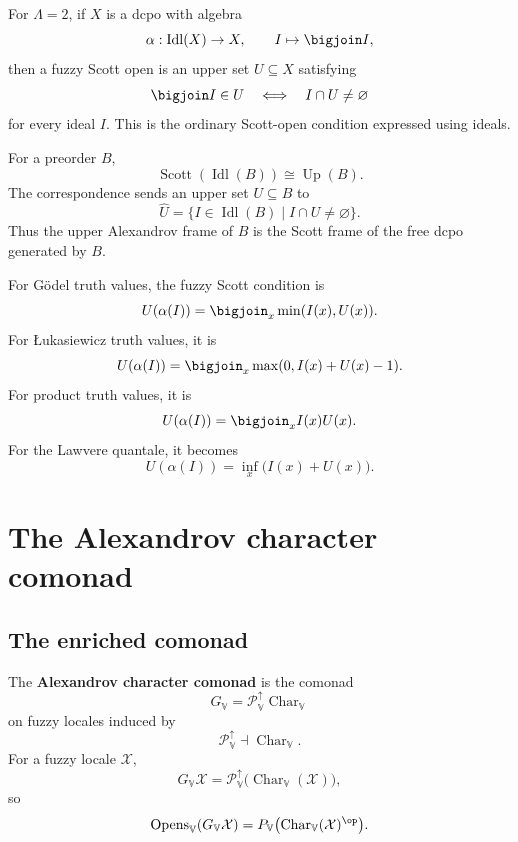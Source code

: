 \begin{example}
\label{ex:crisp-scott-opens}
For \(\Lambda=2\), if \(X\) is a dcpo with algebra
\[
    \alpha:\operatorname{Idl}(X)\to X,
    \qquad
    I\mapsto\bigjoin I,
\]
then a fuzzy Scott open is an upper set \(U\subseteq X\) satisfying
\[
    \bigjoin I\in U
    \quad\Longleftrightarrow\quad
    I\cap U\neq\varnothing
\]
for every ideal \(I\).  This is the ordinary Scott-open condition expressed using
ideals.
\end{example}

\begin{example}
\label{ex:upper-sets-as-scott-opens-ideal-completion}
For a preorder \(B\),
\[
    \operatorname{Scott}(\operatorname{Idl}(B))
    \cong
    \operatorname{Up}(B).
\]
The correspondence sends an upper set \(U\subseteq B\) to
\[
    \widehat U
    =
    \{I\in\operatorname{Idl}(B)\mid I\cap U\neq\varnothing\}.
\]
Thus the upper Alexandrov frame of \(B\) is the Scott frame of the free dcpo
generated by \(B\).
\end{example}

\begin{example}
\label{ex:standard-fuzzy-scott-opens}
For G\"odel truth values, the fuzzy Scott condition is
\[
    U(\alpha(I))
    =
    \bigjoin_x \min(I(x),U(x)).
\]
For {\L}ukasiewicz truth values, it is
\[
    U(\alpha(I))
    =
    \bigjoin_x \max(0,I(x)+U(x)-1).
\]
For product truth values, it is
\[
    U(\alpha(I))
    =
    \bigjoin_x I(x)U(x).
\]
For the Lawvere quantale, it becomes
\[
    U(\alpha(I))
    =
    \inf_x\bigl(I(x)+U(x)\bigr).
\]
\end{example}

\section{The Alexandrov character comonad}
\label{sec:alexandrov-character-comonad}

\subsection{The enriched comonad}
\label{subsec:alexandrov-character-comonad-enriched}

\begin{definition}
\label{def:alexandrov-character-comonad-enriched}
The \textbf{Alexandrov character comonad} is the comonad
\[
    G_{\mathbb V}
    =
    \mathcal P_{\mathbb V}^{\uparrow}\operatorname{Char}_{\mathbb V}
\]
on fuzzy locales induced by
\[
    \mathcal P_{\mathbb V}^{\uparrow}
    \dashv
    \operatorname{Char}_{\mathbb V}.
\]
For a fuzzy locale \(\mathcal X\),
\[
    G_{\mathbb V}\mathcal X
    =
    \mathcal P_{\mathbb V}^{\uparrow}
    \bigl(
        \operatorname{Char}_{\mathbb V}(\mathcal X)
    \bigr),
\]
so
\[
    \operatorname{Opens}_{\mathbb V}(G_{\mathbb V}\mathcal X)
    =
    P_{\mathbb V}
    \bigl(
        \operatorname{Char}_{\mathbb V}(\mathcal X)^{\op}
    \bigr).
\]
\end{definition}

